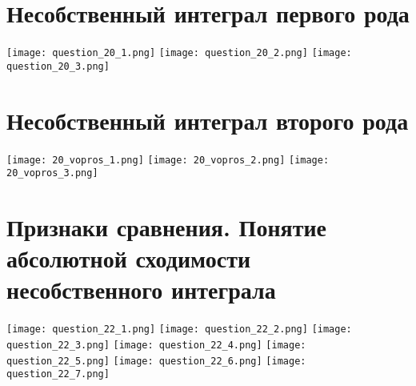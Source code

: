 \documentclass[a4paper,12pt]{article}
\begin{document}
\section{Несобственный интеграл первого рода}
\texttt{[image: question\_20\_1.png]}
\texttt{[image: question\_20\_2.png]}
\texttt{[image: question\_20\_3.png]}

\section{Несобственный интеграл второго рода}
\texttt{[image: 20\_vopros\_1.png]}
\texttt{[image: 20\_vopros\_2.png]}
\texttt{[image: 20\_vopros\_3.png]}

\section{Признаки сравнения. Понятие абсолютной сходимости несобственного интеграла}
\texttt{[image: question\_22\_1.png]}
\texttt{[image: question\_22\_2.png]}
\texttt{[image: question\_22\_3.png]}
\texttt{[image: question\_22\_4.png]}
\texttt{[image: question\_22\_5.png]}
\texttt{[image: question\_22\_6.png]}
\texttt{[image: question\_22\_7.png]}
\end{document}
